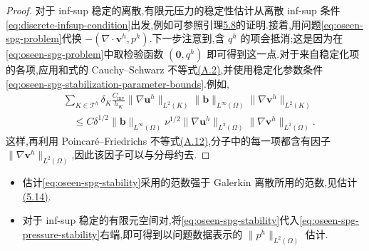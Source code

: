 \begin{proof}
对于 inf-sup 稳定的离散,有限元压力的稳定性估计从离散 inf-sup 条件\cref{eq:discrete-infsup-condition}出发,例如可参照引理\hyperref[lem:oseen-fem-stability]{5.8}的证明.接着,用问题\cref{eq:oseen-spg-problem}代换 $-(\nabla\cdot\bm{v}^h,p^h)$.下一步注意到,含 $q^h$ 的项会抵消;这是因为在\cref{eq:oseen-spg-problem}中取检验函数 $(\bm{0},q^h)$ 即可得到这一点.对于来自稳定化项的各项,应用和式的 Cauchy--Schwarz 不等式\hyperref[eq:appendix-a-2]{(A.2)},并使用稳定化参数条件\cref{eq:oseen-spg-stabilization-parameter-bounds}.例如,
\begin{equation*}
\begin{aligned}
 &\sum_{K\in\mathcal{T}^h}
   \delta_K\frac{C_{\mathrm{inv}}}{h_K}
   \|\nabla\bm{u}^h\|_{L^2(K)}
   \|\bm{b}\|_{L^\infty(\Omega)}
   \|\nabla\bm{v}^h\|_{L^2(K)}\\
 &\quad\le C\delta^{1/2}\|\bm{b}\|_{L^\infty(\Omega)}
       \nu^{1/2}
       \|\nabla\bm{u}^h\|_{L^2(\Omega)}
       \|\nabla\bm{v}^h\|_{L^2(\Omega)}.
\end{aligned}
\end{equation*}
这样,再利用 Poincaré--Friedrichs 不等式\hyperref[eq:appendix-a-12]{(A.12)},分子中的每一项都含有因子 $\|\nabla\bm{v}^h\|_{L^2(\Omega)}$,因此该因子可以与分母约去.
\end{proof}

\begin{note}[稳定性估计的讨论]\label{note:oseen-spg-stability-estimate}
\begin{itemize}
  \item 估计\cref{eq:oseen-spg-stability}采用的范数强于 Galerkin 离散所用的范数,见估计\hyperref[eq:oseen-fem-stability-velocity-hminus1]{(5.14)}.
  \item 对于 inf-sup 稳定的有限元空间对,将\cref{eq:oseen-spg-stability}代入\cref{eq:oseen-spg-pressure-stability}右端,即可得到以问题数据表示的 $\|p^h\|_{L^2(\Omega)}$ 估计.
\end{itemize}
\end{note}

